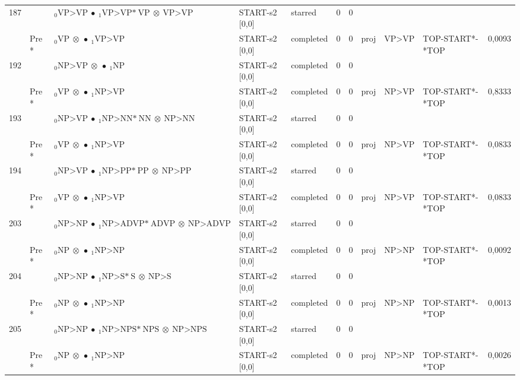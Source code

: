 \documentclass[10pt]{article}
\begin{document}
\begin{longtable}[htbp]{lllllllllll}
187 & & $ {}_0 \textrm{VP>VP} \  \bullet \ {}_{1} \textrm{VP>VP*} \ \textrm{VP} \  \otimes \ \textrm{VP>VP} $ & START-s2 [0,0] & starred & 0 & 0 & & & & \\ 
 & Pre *& $ {}_0 \textrm{VP} \  \otimes \  \bullet \ {}_{1} \textrm{VP>VP} $ & START-s2 [0,0] & completed & 0 & 0 & proj & VP>VP & TOP-START*-*TOP & 0,0093 \\ 
192 & & $ {}_0 \textrm{NP>VP} \  \otimes \  \bullet \ {}_{1} \textrm{NP} $ & START-s2 [0,0] & completed & 0 & 0 & & & & \\ 
 & Pre *& $ {}_0 \textrm{VP} \  \otimes \  \bullet \ {}_{1} \textrm{NP>VP} $ & START-s2 [0,0] & completed & 0 & 0 & proj & NP>VP & TOP-START*-*TOP & 0,8333 \\ 
193 & & $ {}_0 \textrm{NP>VP} \  \bullet \ {}_{1} \textrm{NP>NN*} \ \textrm{NN} \  \otimes \ \textrm{NP>NN} $ & START-s2 [0,0] & starred & 0 & 0 & & & & \\ 
 & Pre *& $ {}_0 \textrm{VP} \  \otimes \  \bullet \ {}_{1} \textrm{NP>VP} $ & START-s2 [0,0] & completed & 0 & 0 & proj & NP>VP & TOP-START*-*TOP & 0,0833 \\ 
194 & & $ {}_0 \textrm{NP>VP} \  \bullet \ {}_{1} \textrm{NP>PP*} \ \textrm{PP} \  \otimes \ \textrm{NP>PP} $ & START-s2 [0,0] & starred & 0 & 0 & & & & \\ 
 & Pre *& $ {}_0 \textrm{VP} \  \otimes \  \bullet \ {}_{1} \textrm{NP>VP} $ & START-s2 [0,0] & completed & 0 & 0 & proj & NP>VP & TOP-START*-*TOP & 0,0833 \\ 
203 & & $ {}_0 \textrm{NP>NP} \  \bullet \ {}_{1} \textrm{NP>ADVP*} \ \textrm{ADVP} \  \otimes \ \textrm{NP>ADVP} $ & START-s2 [0,0] & starred & 0 & 0 & & & & \\ 
 & Pre *& $ {}_0 \textrm{NP} \  \otimes \  \bullet \ {}_{1} \textrm{NP>NP} $ & START-s2 [0,0] & completed & 0 & 0 & proj & NP>NP & TOP-START*-*TOP & 0,0092 \\ 
204 & & $ {}_0 \textrm{NP>NP} \  \bullet \ {}_{1} \textrm{NP>S*} \ \textrm{S} \  \otimes \ \textrm{NP>S} $ & START-s2 [0,0] & starred & 0 & 0 & & & & \\ 
 & Pre *& $ {}_0 \textrm{NP} \  \otimes \  \bullet \ {}_{1} \textrm{NP>NP} $ & START-s2 [0,0] & completed & 0 & 0 & proj & NP>NP & TOP-START*-*TOP & 0,0013 \\ 
205 & & $ {}_0 \textrm{NP>NP} \  \bullet \ {}_{1} \textrm{NP>NPS*} \ \textrm{NPS} \  \otimes \ \textrm{NP>NPS} $ & START-s2 [0,0] & starred & 0 & 0 & & & & \\ 
 & Pre *& $ {}_0 \textrm{NP} \  \otimes \  \bullet \ {}_{1} \textrm{NP>NP} $ & START-s2 [0,0] & completed & 0 & 0 & proj & NP>NP & TOP-START*-*TOP & 0,0026 \\ 

\end{longtable}
\end{document}
